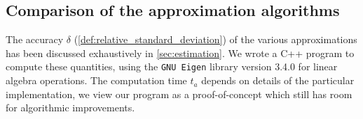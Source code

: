 \documentclass[12pt]{article}
\numberwithin{equation}{section}
\begin{document}
\subsection{Comparison of the  approximation algorithms}\label{sec:performance}

The accuracy $\delta$ (\cref{def:relative_standard_deviation}) of the various approximations has been discussed exhaustively in \cref{sec:estimation}. We wrote a C++ program to compute these quantities, using the \texttt{GNU Eigen} library version 3.4.0 for linear algebra operations. The computation time $t_a$ depends on  details of the particular implementation, we view our program as a proof-of-concept which still has room for algorithmic improvements. 
\end{document}

